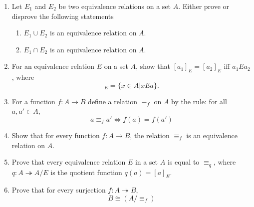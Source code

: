 \documentclass[10pt,\jkfside,a4paper]{article}
\begin{document}
\begin{enumerate}

\item Let $E_1$ and $E_2$ be two equivalence relations on a set $A$. Either prove or disprove 
the following statements

\begin{enumerate}

\item $E_1 \cup E_2$ is an equivalence relation on $A$.



\item $E_1 \cap E_2$ is an equivalence relation on $A$.



\end{enumerate}

\item For an equivalence relation $E$ on a set $A$, show that $[a_1]_E = [a_2]_E$ iff $a_1 E a_2$, 
where 
\begin{equation}
[a]_E = \{x \in A | x E a\}.
\end{equation}



\item For a function $f: A \rightarrow B$ define a relation $\equiv_f$ on $A$ by the rule: 
for all $a, a' \in A$,
\begin{equation}
a \equiv_f a' \Longleftrightarrow f(a) = f(a')
\end{equation}

\item Show that for every function $f: A \rightarrow B$, the relation $\equiv_f$ is an equivalence 
relation on $A$.



\item Prove that every equivalence relation $E$ in a set $A$ is equal to $\equiv_q$, where $q: A \twoheadrightarrow A/E$ 
is the quotient function $q(a) = [a]_E$.



\item Prove that for every surjection $f: A \twoheadrightarrow B$,
\begin{equation}
B \cong (A/ \equiv_f)
\end{equation}

\end{enumerate}
\end{document}
